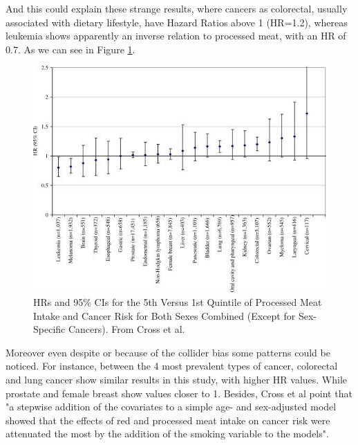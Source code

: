 \documentclass{article}
\begin{document}
And this could explain these strange results, where cancers as colorectal, usually associated with dietary lifestyle, have Hazard Ratios above 1 (HR=1.2), whereas leukemia shows apparently an inverse relation to processed meat, with an HR of 0.7. As we can see in Figure \ref{fig:cross}.
\begin{figure}
  \includegraphics[scale=0.75]{tileshop2}
  \caption{HRs and 95\% CIs for the 5th Versus 1st Quintile of Processed Meat Intake and Cancer Risk for Both Sexes Combined (Except for Sex-Specific Cancers). From Cross et al.\cite{cross}}
  \label{fig:cross}
\end{figure}



Moreover even despite or because of the collider bias some patterns could be noticed. For instance, between the 4 most prevalent types of cancer, colorectal and lung cancer show similar results in this study, with higher HR values. While prostate and female breast show values closer to 1. Besides, Cross et al point that "a stepwise addition of the covariates to a simple age- and sex-adjusted model showed that the effects of red and processed meat intake on cancer risk were attenuated the most by the addition of the smoking variable to the models". %
\end{document}

